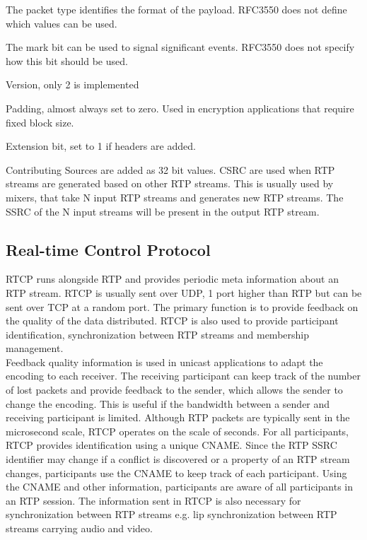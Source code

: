 The packet type identifies the format of the payload. RFC3550 does not define which values can be used.


The mark bit can be used to signal significant events. RFC3550 does not specify how this bit should be used.

Version, only 2 is implemented

Padding, almost always set to zero. Used in encryption applications that require fixed block size.

Extension bit, set to 1 if headers are added.

Contributing Sources are added as 32 bit values. CSRC are used when RTP streams are generated based on other RTP streams. This is usually used by mixers, that take N input RTP streams and generates new RTP streams. The SSRC of the N input streams will be present in the output RTP stream.

\subsection{Real-time Control Protocol} \label{sec:design:rtcp}
RTCP runs alongside RTP and provides periodic meta information about an RTP stream. RTCP is usually sent over UDP, 1 port higher than RTP but can be sent over TCP at a random port. The primary function is to provide feedback on the quality of the data distributed. RTCP is also used to provide participant identification, synchronization between RTP streams and membership management.\\

Feedback quality information is used in unicast applications to adapt the encoding to each receiver. The receiving participant can keep track of the number of lost packets and provide feedback to the sender, which allows the sender to change the encoding. This is useful if the bandwidth between a sender and receiving participant is limited.
Although RTP packets are typically sent in the microsecond scale, RTCP operates on the scale of seconds.
For all participants, RTCP provides identification using a unique \ac{CNAME}.
Since the RTP SSRC identifier may change if a conflict is discovered or a property of an RTP stream changes, participants use the CNAME to keep track of each participant. Using the CNAME and other information, participants are aware of all participants in an RTP session.
The information sent in RTCP is also necessary for synchronization between RTP streams e.g. lip synchronization between RTP streams carrying audio and video.

